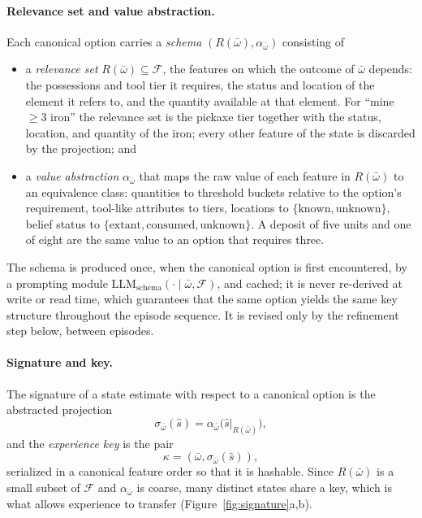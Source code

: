 \documentclass[11pt]{article}
\newcommand{\llm}[1]{\mathrm{LLM}_{\mathrm{#1}}}
\newcommand{\calF}{\mathcal{F}}
\newcommand{\Rel}{R}
\newcommand{\shat}{\hat{s}}
\begin{document}
\paragraph{Relevance set and value abstraction.}
Each canonical option carries a \emph{schema} $(\Rel(\bar\omega),\alpha_{\bar\omega})$ consisting of
\begin{itemize}[leftmargin=1.5em,itemsep=1pt]
\item a \emph{relevance set} $\Rel(\bar\omega)\subseteq\calF$, the features on which the outcome of $\bar\omega$ depends: the possessions and tool tier it requires, the status and location of the element it refers to, and the quantity available at that element. For ``mine $\ge 3$ iron'' the relevance set is the pickaxe tier together with the status, location, and quantity of the iron; every other feature of the state is discarded by the projection; and
\item a \emph{value abstraction} $\alpha_{\bar\omega}$ that maps the raw value of each feature in $\Rel(\bar\omega)$ to an equivalence class: quantities to threshold buckets relative to the option's requirement, tool-like attributes to tiers, locations to $\{\mathrm{known},\mathrm{unknown}\}$, belief status to $\{\mathrm{extant},\mathrm{consumed},\mathrm{unknown}\}$. A deposit of five units and one of eight are the same value to an option that requires three.
\end{itemize}
The schema is produced once, when the canonical option is first encountered, by a prompting module $\llm{schema}(\cdot\mid\bar\omega,\calF)$, and cached; it is never re-derived at write or read time, which guarantees that the same option yields the same key structure throughout the episode sequence. It is revised only by the refinement step below, between episodes.

\paragraph{Signature and key.}
The signature of a state estimate with respect to a canonical option is the abstracted projection
\begin{equation}
\sigma_{\bar\omega}(\shat)=\alpha_{\bar\omega}\big(\shat|_{\Rel(\bar\omega)}\big),
\label{eq:signature}
\end{equation}
and the \emph{experience key} is the pair
\begin{equation}
\kappa=(\bar\omega,\sigma_{\bar\omega}(\shat)),
\label{eq:key}
\end{equation}
serialized in a canonical feature order so that it is hashable. Since $\Rel(\bar\omega)$ is a small subset of $\calF$ and $\alpha_{\bar\omega}$ is coarse, many distinct states share a key, which is what allows experience to transfer (Figure~\ref{fig:signature}a,b).
\end{document}

